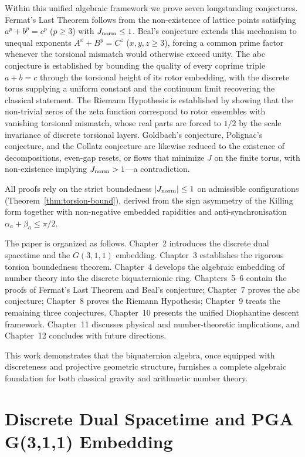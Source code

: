 \documentclass[dvipdfmx,a4paper]{article}
\theoremstyle{definition}
\theoremstyle{remark}
\newcommand{\Jnorm}{J_{\rm norm}}
\begin{document}
Within this unified algebraic framework we prove seven longstanding conjectures. Fermat's Last Theorem follows from the non-existence of lattice points satisfying \(a^p + b^p = c^p\) (\(p \geq 3\)) with \(\Jnorm \leq 1\). Beal's conjecture extends this mechanism to unequal exponents \(A^x + B^y = C^z\) (\(x,y,z \geq 3\)), forcing a common prime factor whenever the torsional mismatch would otherwise exceed unity. The abc conjecture is established by bounding the quality of every coprime triple \(a + b = c\) through the torsional height of its rotor embedding, with the discrete torus supplying a uniform constant and the continuum limit recovering the classical statement. The Riemann Hypothesis is established by showing that the non-trivial zeros of the zeta function correspond to rotor ensembles with vanishing torsional mismatch, whose real parts are forced to \(1/2\) by the scale invariance of discrete torsional layers. Goldbach's conjecture, Polignac's conjecture, and the Collatz conjecture are likewise reduced to the existence of decompositions, even-gap resets, or flows that minimize \(J\) on the finite torus, with non-existence implying \(\Jnorm > 1\)---a contradiction.

All proofs rely on the strict boundedness \(|\Jnorm| \leq 1\) on admissible configurations (Theorem~\ref{thm:torsion-bound}), derived from the sign asymmetry of the Killing form together with non-negative embedded rapidities and anti-synchronisation \(\alpha_a + \beta_a \leq \pi/2\).

The paper is organized as follows. Chapter~2 introduces the discrete dual spacetime and the \(G(3,1,1)\) embedding. Chapter~3 establishes the rigorous torsion boundedness theorem. Chapter~4 develops the algebraic embedding of number theory into the discrete biquaternionic ring. Chapters~5--6 contain the proofs of Fermat's Last Theorem and Beal's conjecture; Chapter~7 proves the abc conjecture; Chapter~8 proves the Riemann Hypothesis; Chapter~9 treats the remaining three conjectures. Chapter~10 presents the unified Diophantine descent framework. Chapter~11 discusses physical and number-theoretic implications, and Chapter~12 concludes with future directions.

This work demonstrates that the biquaternion algebra, once equipped with discreteness and projective geometric structure, furnishes a complete algebraic foundation for both classical gravity and arithmetic number theory.

\section{Discrete Dual Spacetime and PGA G(3,1,1) Embedding}
\end{document}
